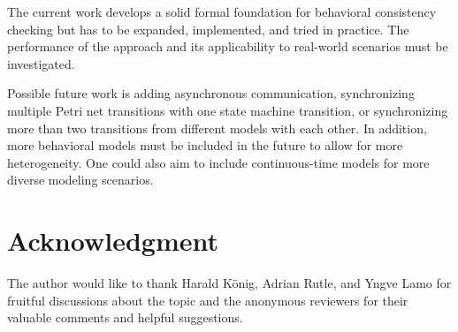 \documentclass[conference]{IEEEtran}
\begin{document}
The current work develops a solid formal foundation for behavioral consistency checking but has to be expanded, implemented, and tried in practice.
The performance of the approach and its applicability to real-world scenarios must be investigated.

Possible future work is adding asynchronous communication, synchronizing multiple Petri net transitions with one state machine transition, or synchronizing more than two transitions from different models with each other.
In addition, more behavioral models must be included in the future to allow for more heterogeneity.
One could also aim to include continuous-time models for more diverse modeling scenarios.

\section*{Acknowledgment}
The author would like to thank Harald König, Adrian Rutle, and Yngve Lamo for fruitful discussions about the topic and the anonymous reviewers for their valuable comments and helpful suggestions.



\end{document}
